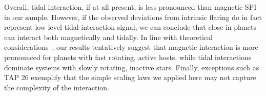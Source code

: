\documentclass[twocolumn]{aastex631}
\begin{document}
Overall, tidal interaction, if at all present, is less pronounced than magnetic SPI in our sample. However, if the observed deviations from intrinsic flaring do in fact represent low level tidal interaction signal, we can conclude that close-in planets can interact both magnetically and tidally. In line with theoretical considerations~\citep{strugarek2017fate}, our results tentatively suggest that magnetic interaction is more pronounced for planets with fast rotating, active hosts, while tidal interactions dominate systems with slowly rotating, inactive stars. Finally, exceptions such as TAP 26 exemplify that the simple scaling laws we applied here may not capture the complexity of the interaction.



\end{document}
